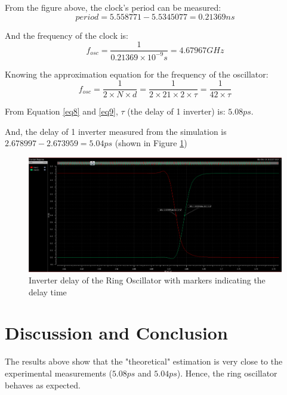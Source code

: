 \documentclass[letterpaper, 11pt]{article}
\begin{document}
From the figure above, the clock's period can be measured:
\begin{equation}
period = 5.558771 - 5.5345077 = 0.21369ns
\end{equation}

And the frequency of the clock is:
\begin{equation}\label{eq8}
f_{osc} = \frac{1}{0.21369\times10^{-9}s} = 4.67967 GHz
\end{equation}

Knowing the approximation equation for the frequency of the oscillator:
\begin{equation}\label{eq9}
f_{osc} = \frac{1}{2\times N\times d} = \frac{1}{2\times 21 \times 2 \times \tau} = \frac{1}{42\times \tau}
\end{equation}

From Equation \ref{eq8} and \ref{eq9}, $\tau$ (the delay of 1 inverter) is: $5.08ps$.

And, the delay of 1 inverter measured from the simulation is $2.678997-2.673959 = 5.04ps$ (shown in Figure \ref{fig10})
\begin{figure}[htb!]
	\centering
	\includegraphics[width=0.75\linewidth]{ring_osc_inv_delay.png}
	\caption{Inverter delay of the Ring Oscillator with markers indicating the delay time}
	\label{fig10}
\end{figure}

\section{Discussion and Conclusion}

The results above show that the "theoretical" estimation is very close to the experimental measurements ($5.08ps$ and $5.04ps$). Hence, the ring oscillator behaves as expected.
\end{document}
